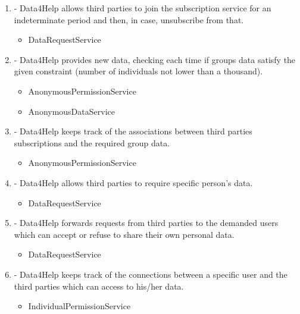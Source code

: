 \documentclass[a4paper]{article}
\begin{document}
\begin{enumerate}[label*=\bf{R.\arabic*}]
\item - Data4Help allows third parties to join the subscription service for an
indeterminate period and then, in case, unsubscribe from that.

\begin{itemize}
\item DataRequestService
\end{itemize}

\item - Data4Help provides new data, checking each time if groups data satisfy the given constraint (number of individuals not lower than a
thousand).

\begin{itemize}
\item AnonymousPermissionService
\item AnonymousDataService
\end{itemize}

\item - Data4Help keeps track of the associations between third parties subscriptions and the required group data.

\begin{itemize}
\item AnonymousPermissionService
\end{itemize}

\item - Data4Help allows third parties to require specific person’s data.

\begin{itemize}
\item DataRequestService
\end{itemize}

\item - Data4Help forwards requests from third parties to the demanded
users which can accept or refuse to share their own personal data.

\begin{itemize}
\item DataRequestService
\end{itemize}

\item - Data4Help keeps track of the connections between a specific user and
the third parties which can access to his/her data.

\begin{itemize}
\item IndividualPermissionService
\end{itemize}


\end{enumerate}
\end{document}
